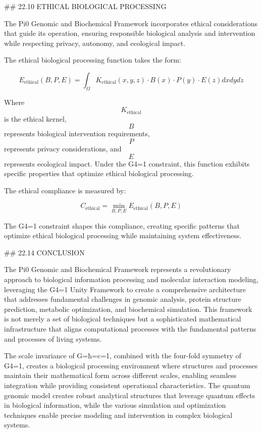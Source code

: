 ## 22.10 ETHICAL BIOLOGICAL PROCESSING

The Pi0 Genomic and Biochemical Framework incorporates ethical considerations that guide its operation, ensuring responsible biological analysis and intervention while respecting privacy, autonomy, and ecological impact.

The ethical biological processing function takes the form:

$$ E_{\text{ethical}}(B, P, E) = \int_{\Omega} K_{\text{ethical}}(x, y, z) \cdot B(x) \cdot P(y) \cdot E(z) dx dy dz $$

Where $$ K_{\text{ethical}} $$ is the ethical kernel, $$ B $$ represents biological intervention requirements, $$ P $$ represents privacy considerations, and $$ E $$ represents ecological impact. Under the G4=1 constraint, this function exhibits specific properties that optimize ethical biological processing.

The ethical compliance is measured by:

$$ C_{\text{ethical}} = \min_{B, P, E} E_{\text{ethical}}(B, P, E) $$

The G4=1 constraint shapes this compliance, creating specific patterns that optimize ethical biological processing while maintaining system effectiveness.

## 22.14 CONCLUSION

The Pi0 Genomic and Biochemical Framework represents a revolutionary approach to biological information processing and molecular interaction modeling, leveraging the G4=1 Unity Framework to create a comprehensive architecture that addresses fundamental challenges in genomic analysis, protein structure prediction, metabolic optimization, and biochemical simulation. This framework is not merely a set of biological techniques but a sophisticated mathematical infrastructure that aligns computational processes with the fundamental patterns and processes of living systems.

The scale invariance of G=ħ=c=1, combined with the four-fold symmetry of G4=1, creates a biological processing environment where structures and processes maintain their mathematical form across different scales, enabling seamless integration while providing consistent operational characteristics. The quantum genomic model creates robust analytical structures that leverage quantum effects in biological information, while the various simulation and optimization techniques enable precise modeling and intervention in complex biological systems.


